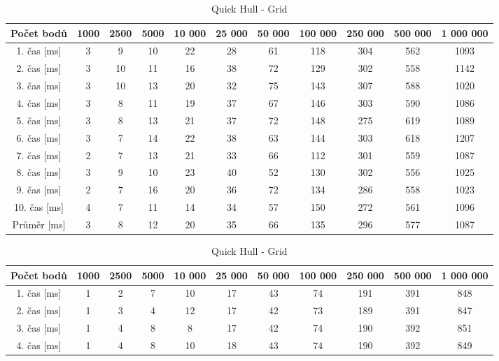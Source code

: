 \documentclass{article}
\begin{document}
\begin{center}
	\begin{table}[]
	\centering
	\caption{Quick Hull - Random}
	\label{my-label}
	\begin{tabular}{|c|c|c|c|c|c|c|c|c|c|c|}
		\hline 
 	Počet bodů&  1000& 2500 & 5000 & 10 000 & 25 000 & 50 000  & 100 000  & 250 000  & 500 000 & 1 000 000  \\ \hline \hline
 		1. čas [ms]&  3&  9&  10&   22&  28&  61&  118&  304&  562&  1093\\ \hline
 		2. čas [ms]&  3&10&  11&  16&  38&  72&  129&  302&  558&  1142\\ \hline
 		3. čas [ms]&  3&10&  13&  20&  32&  75&  143&  307&  588&  1020\\ \hline
 		4. čas [ms]&  3&  8&  11&  19&  37&  67&  146&  303&  590&  1086\\ \hline
 		5. čas [ms]&  3&  8&  13&  21&  37&  72&  148&  275&  619&  1089\\ \hline
 		6. čas [ms]&  3&  7&  14&  22&  38&  63&  144&  303&  618&  1207\\ \hline
 		7. čas [ms]&  2&  7&  13&  21&  33&  66&  112&  301&  559&  1087\\ \hline
 		8. čas [ms]&  3&  9&  10&  23&  40&  52&  130&  302&  556&  1025\\ \hline
 		9. čas [ms]&  2&  7&  16&  20&  36&  72&  134&  286&  558&  1023\\ \hline
		10. čas [ms]&4& 7&  11&  14&  34&  57&  150&  272&  561&  1096\\ \hline \hline
 		Průměr [ms]& 3 &8  &12 &20  &35  &66  &135  &296  &  577& 1087  \\ \hline
	\end{tabular}
%
	\centering
	\caption{Quick Hull - Grid}
	\label{my-label}
	\begin{tabular}{|c|c|c|c|c|c|c|c|c|c|c|}
		\hline 
 	Počet bodů&  1000& 2500 & 5000 & 10 000 & 25 000 & 50 000  & 100 000  & 250 000  & 500 000 & 1 000 000  \\ \hline \hline
 		1. čas [ms]&  1&  2&  7&  10&  17&  43&  74&  191&  391&  848\\ \hline
 		2. čas [ms]&  1&  3&  4&  12&  17&  42&  73&  189&  391&  847\\ \hline
 		3. čas [ms]&  1&  4&  8&    8&  17&  42&  74&  190&  392&  851\\ \hline
 		4. čas [ms]&  1&  4&  8&  10&  18&  43&  74&  190&  392&  849\\ \hline

\end{tabular}
\end{table}
\end{center}
\end{document}
